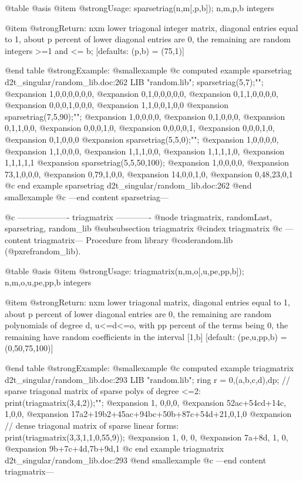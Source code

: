 @table @asis
@item @strong{Usage:}
sparsetriag(n,m[,p,b]); n,m,p,b integers

@item @strong{Return:}
nxm lower triagonal integer matrix, diagonal entries equal to 1, about
p percent of lower diagonal entries are 0, the remaining are random
integers >=1 and <= b; [defaults: (p,b) = (75,1)]

@end table
@strong{Example:}
@smallexample
@c computed example sparsetriag d2t_singular/random_lib.doc:262 
LIB "random.lib";
sparsetriag(5,7);"";
@expansion{} 1,0,0,0,0,0,0,
@expansion{} 0,1,0,0,0,0,0,
@expansion{} 0,1,1,0,0,0,0,
@expansion{} 0,0,0,1,0,0,0,
@expansion{} 1,1,0,0,1,0,0 
@expansion{} 
sparsetriag(7,5,90);"";
@expansion{} 1,0,0,0,0,
@expansion{} 0,1,0,0,0,
@expansion{} 0,1,1,0,0,
@expansion{} 0,0,0,1,0,
@expansion{} 0,0,0,0,1,
@expansion{} 0,0,0,1,0,
@expansion{} 0,1,0,0,0 
@expansion{} 
sparsetriag(5,5,0);"";
@expansion{} 1,0,0,0,0,
@expansion{} 1,1,0,0,0,
@expansion{} 1,1,1,0,0,
@expansion{} 1,1,1,1,0,
@expansion{} 1,1,1,1,1 
@expansion{} 
sparsetriag(5,5,50,100);
@expansion{} 1,0,0,0,0,
@expansion{} 73,1,0,0,0,
@expansion{} 0,79,1,0,0,
@expansion{} 14,0,0,1,0,
@expansion{} 0,48,23,0,1 
@c end example sparsetriag d2t_singular/random_lib.doc:262
@end smallexample
@c ---end content sparsetriag---

@c ------------------- triagmatrix -------------
@node triagmatrix, randomLast, sparsetriag, random_lib
@subsubsection triagmatrix
@cindex triagmatrix
@c ---content triagmatrix---
Procedure from library @code{random.lib} (@pxref{random_lib}).

@table @asis
@item @strong{Usage:}
triagmatrix(n,m,o[,u,pe,pp,b]); n,m,o,u,pe,pp,b integers

@item @strong{Return:}
nxm lower triagonal matrix, diagonal entries equal to 1, about
p percent of lower diagonal entries are 0, the remaining
are random polynomials of degree d, u<=d<=o, with pp percent of
the terms being 0, the remaining have random coefficients
in the interval [1,b] [default: (pe,u,pp,b) = (0,50,75,100)]

@end table
@strong{Example:}
@smallexample
@c computed example triagmatrix d2t_singular/random_lib.doc:293 
LIB "random.lib";
ring r = 0,(a,b,c,d),dp;
// sparse triagonal matrix of sparse polys of degree <=2:
print(triagmatrix(3,4,2));"";
@expansion{} 1,                                 0,0,0,
@expansion{} 52ac+54cd+14c,                     1,0,0,
@expansion{} 17a2+19b2+45ac+94bc+50b+87c+54d+21,0,1,0 
@expansion{} 
// dense triagonal matrix of sparse linear forms:
print(triagmatrix(3,3,1,1,0,55,9));
@expansion{} 1,       0,    0,
@expansion{} 7a+8d,   1,    0,
@expansion{} 9b+7c+4d,7b+9d,1 
@c end example triagmatrix d2t_singular/random_lib.doc:293
@end smallexample
@c ---end content triagmatrix---

